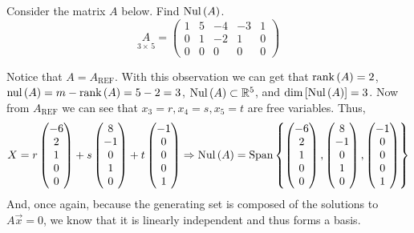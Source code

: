 \begin{example}{}{}
    Consider the matrix $A$ below. Find $\text{Nul}\left(A\right)$. 
    \[
        \underset{3\times\,5}{A} = \begin{pmatrix}
            1 & 5 & -4 & -3 & 1 \\
            0 & 1 & -2 & 1 & 0 \\
            0 & 0 & 0 & 0 & 0
        \end{pmatrix}
    \]

    \begin{solution}
        Notice that $A=A_{\text{REF}}$. With this observation we can get that $\text{rank}\left(A\right)=2$, $\text{nul}\left(A\right) = m - \text{rank}\left(A\right) = 5 - 2 = 3$, $\text{Nul}\left(A\right) \subset \mathbb R^{5}$, and $\dim\left[\text{Nul}\left(A\right)\right] = 3$. Now from $A_{\text{REF}}$ we can see that $x_3 = r, x_4 = s, x_5=t$ are free variables. Thus, 
        \[
            X = r\begin{pmatrix}
                -6 \\ 2 \\ 1 \\ 0 \\ 0
            \end{pmatrix} 
            + s\begin{pmatrix}
                8 \\ -1 \\ 0 \\ 1 \\ 0
            \end{pmatrix}
            + t\begin{pmatrix}
                -1 \\ 0 \\ 0 \\ 0 \\ 1
            \end{pmatrix}
            \Rightarrow
            \text{Nul}\left(A\right) = \text{Span}\left\{
                \begin{pmatrix}
                    -6 \\ 2 \\ 1 \\ 0 \\ 0
                \end{pmatrix},
                \begin{pmatrix}
                    8 \\ -1 \\ 0 \\ 1 \\ 0
                \end{pmatrix},
                \begin{pmatrix}
                    -1 \\ 0 \\ 0 \\ 0 \\ 1
                \end{pmatrix}
             \right\}
        \]
        And, once again, because the generating set is composed of the solutions to $A\vec{x} = 0$, we know that it is linearly independent and thus forms a basis.
    \end{solution}
\end{example}

